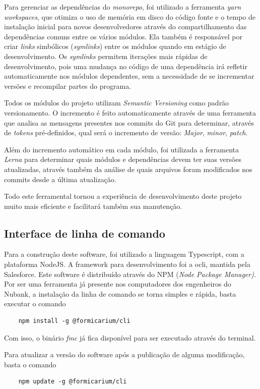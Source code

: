 Para gerenciar as dependências do \textit{monorepo}, foi utilizado a ferramenta \textit{yarn workspaces}, que otimiza o uso de memória em disco do código fonte e o tempo de instalação inicial para novos desenvolvedores através do compartilhamento das dependências comuns entre os vários módulos. Ela também é responsável por criar \textit{links} simbólicos (\textit{symlinks}) entre os módulos quando em estágio de desenvolvimento. Os \textit{symlinks} permitem iterações mais rápidas de desenvolvimento, pois uma mudança no código de uma dependência irá refletir automaticamente nos módulos dependentes, sem a necessidade de se incrementar versões e recompilar partes do programa.

Todos os módulos do projeto utilizam \textit{Semantic Versioning} como padrão versionamento. O incremento é feito automaticamente através de uma ferramenta que analisa as mensagens presentes nos commits do Git para determinar, através de \textit{tokens} pré-definidos, qual será o incremento de versão: \textit{Major}, \textit{minor}, \textit{patch}.

Além do incremento automático em cada módulo, foi utilizada a ferramenta \textit{Lerna} para determinar quais módulos e dependências devem ter suas versões atualizadas, através também da análise de quais arquivos foram modificados nos commits desde a última atualização.

Todo este ferramental tornou a experiência de desenvolvimento deste projeto muito mais eficiente e facilitará também sua manutenção.

    \subsection{Interface de linha de comando}
    Para a construção deste software, foi utilizado a linguagem Typescript, com a plataforma NodeJS. A framework para desenvolvimento foi a ocli, mantida pela Salesforce.
    Este software é distribuído através do NPM (\textit{Node Package Manager)}. Por ser uma ferramenta já presente nos computadores dos engenheiros do Nubank, a instalação da linha de comando se torna simples e rápida, basta executar o comando
    \begin{verbatim}
	npm install -g @formicarium/cli
	\end{verbatim}
	
	Com isso, o binário \textit{fmc} já fica disponível para ser executado através do terminal.
	
	Para atualizar a versão do software após a publicação de alguma modificação, basta o comando
	\begin{verbatim}
	npm update -g @formicarium/cli
	\end{verbatim}
	
